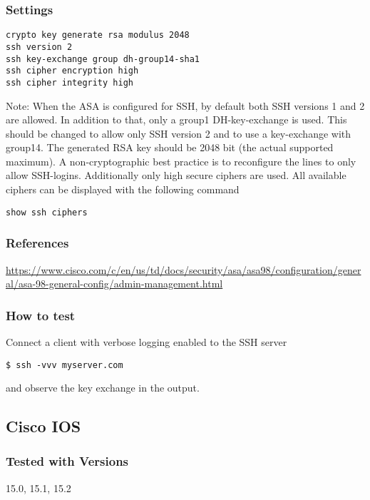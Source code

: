 \subsubsection{Settings}
\begin{lstlisting}
crypto key generate rsa modulus 2048
ssh version 2
ssh key-exchange group dh-group14-sha1
ssh cipher encryption high
ssh cipher integrity high
\end{lstlisting}
Note: When the ASA is configured for SSH, by default both SSH versions 1 and 2 are allowed. In addition to that, only a group1 DH-key-exchange is used. This should be changed to allow only SSH version 2 and to use a key-exchange with group14. The generated RSA key should be 2048 bit (the actual supported maximum). A non-cryptographic best practice is to reconfigure the lines to only allow SSH-logins. Additionally only high secure ciphers are used. All available ciphers can be displayed with the following command
\begin{lstlisting}
show ssh ciphers
\end{lstlisting}

\subsubsection{References}
\begin{itemize*}
  \item \url{https://www.cisco.com/c/en/us/td/docs/security/asa/asa98/configuration/general/asa-98-general-config/admin-management.html}
\end{itemize*}

\subsubsection{How to test}
Connect a client with verbose logging enabled to the SSH server
\begin{lstlisting}
$ ssh -vvv myserver.com
\end{lstlisting}and observe the key exchange in the output.


\subsection{Cisco IOS}
\subsubsection{Tested with Versions}
\begin{itemize*}
  \item 15.0, 15.1, 15.2
\end{itemize*}



